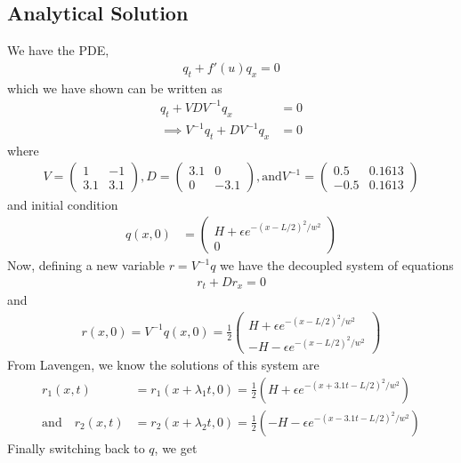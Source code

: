 \subsection{Analytical Solution}
We have the PDE, 
\begin{align*}
q_t + f'(u) q_x = 0
\end{align*}
which we have shown can be written as 
\begin{align*}
q_t + V D V^{-1} q_x &= 0 \\
\implies V^{-1} q_t + D V^{-1} q_x &= 0
\end{align*}
where 
\begin{align*}
 V = \begin{pmatrix}
1 & -1 \\
3.1 & 3.1
\end{pmatrix}, D= \begin{pmatrix}
3.1 & 0 \\
0 & -3.1
\end{pmatrix},  \text{and} V^{-1} = \begin{pmatrix}
0.5 & 0.1613 \\
-0.5 & 0.1613
\end{pmatrix}
\end{align*} and initial condition
\begin{align*}
q(x,0) &= \begin{pmatrix}
H + \epsilon e^{-(x-L/2)^2/w^2} \\
0
\end{pmatrix} 
\end{align*}
Now, defining a new variable $r = V^{-1} q$ we have the decoupled system of equations
\begin{align*}
r_t + Dr_x = 0
\end{align*}
and 
\begin{align*}
r(x,0) = V^{-1} q(x,0) = \frac{1}{2} \begin{pmatrix}
H + \epsilon e^{-(x-L/2)^2/w^2} \\
-H - \epsilon e^{-(x-L/2)^2/w^2}
\end{pmatrix} 
\end{align*}
From Lavengen, we know the solutions of this system are 
\begin{align*}
	r_1(x,t)&=r_1(x+\lambda_1t,0)=\frac{1}{2} (H + \epsilon e^{-(x+3.1t-L/2)^2/w^2}) \\
	\text{and} \quad r_2(x,t)&=r_2(x+\lambda_2t,0)= \frac{1}{2}(-H - \epsilon e^{-(x-3.1t-L/2)^2/w^2})
\end{align*} 
Finally switching back to $q$, we get 
